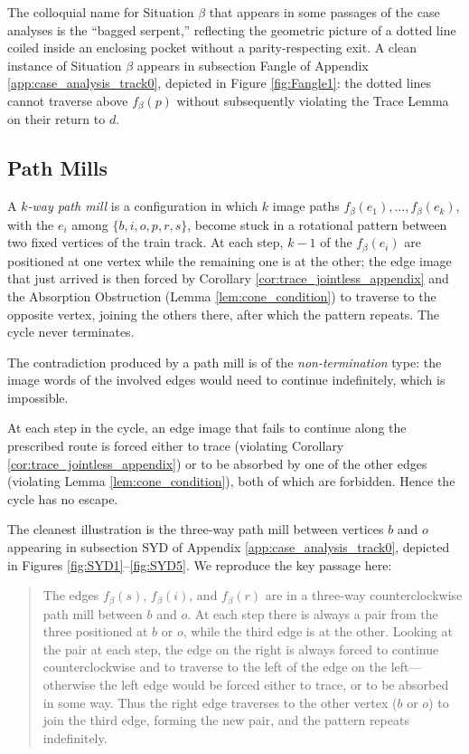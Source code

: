The colloquial name for Situation $\beta$ that appears in some passages of the case analyses is the ``bagged serpent,'' reflecting the geometric picture of a dotted line coiled inside an enclosing pocket without a parity-respecting exit. A clean instance of Situation $\beta$ appears in subsection Fangle of Appendix \ref{app:case_analysis_track0}, depicted in Figure \ref{fig:Fangle1}: the dotted lines cannot traverse above $f_\beta(p)$ without subsequently violating the Trace Lemma on their return to $d$.

\subsection{Path Mills}
\label{ssec:path_mills_appendix}

\begin{definition}
\label{def:path_mill}
A \emph{$k$-way path mill} is a configuration in which $k$ image paths $f_\beta(e_1), \dots, f_\beta(e_k)$, with the $e_i$ among $\{b, i, o, p, r, s\}$, become stuck in a rotational pattern between two fixed vertices of the train track. At each step, $k-1$ of the $f_\beta(e_i)$ are positioned at one vertex while the remaining one is at the other; the edge image that just arrived is then forced by Corollary \ref{cor:trace_jointless_appendix} and the Absorption Obstruction (Lemma \ref{lem:cone_condition}) to traverse to the opposite vertex, joining the others there, after which the pattern repeats. The cycle never terminates.
\end{definition}

The contradiction produced by a path mill is of the \emph{non-termination} type: the image words of the involved edges would need to continue indefinitely, which is impossible.

At each step in the cycle, an edge image that fails to continue along the prescribed route is forced either to trace (violating Corollary \ref{cor:trace_jointless_appendix}) or to be absorbed by one of the other edges (violating Lemma \ref{lem:cone_condition}), both of which are forbidden. Hence the cycle has no escape.

The cleanest illustration is the three-way path mill between vertices $b$ and $o$ appearing in subsection SYD of Appendix \ref{app:case_analysis_track0}, depicted in Figures \ref{fig:SYD1}--\ref{fig:SYD5}. We reproduce the key passage here:

\begin{quote}
The edges $f_\beta(s)$, $f_\beta(i)$, and $f_\beta(r)$ are in a three-way counterclockwise path mill between $b$ and $o$. At each step there is always a pair from the three positioned at $b$ or $o$, while the third edge is at the other. Looking at the pair at each step, the edge on the right is always forced to continue counterclockwise and to traverse to the left of the edge on the left---otherwise the left edge would be forced either to trace, or to be absorbed in some way. Thus the right edge traverses to the other vertex ($b$ or $o$) to join the third edge, forming the new pair, and the pattern repeats indefinitely.
\end{quote}

